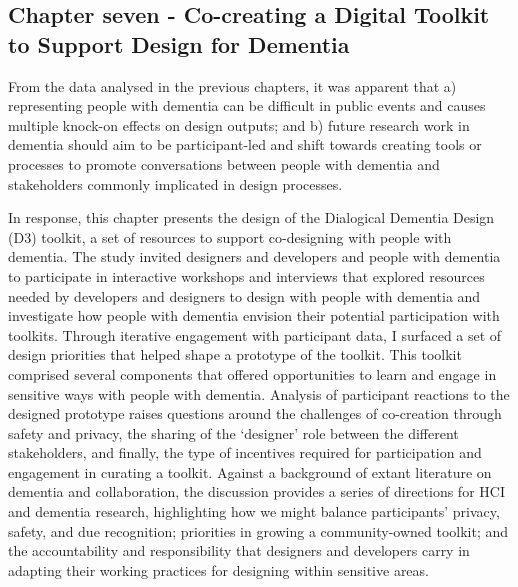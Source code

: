 \subsection{Chapter seven - Co-creating a Digital Toolkit to Support Design for Dementia}
\label{Intro:ChapterSeven}
From the data analysed in the previous chapters, it was apparent that a) representing people with dementia can be difficult in public events and causes multiple knock-on effects on design outputs; and b) future research work in dementia should aim to be participant-led and shift towards creating tools or processes to promote conversations between people with dementia and stakeholders commonly implicated in design processes.

In response, this chapter presents the design of the Dialogical Dementia Design (D3) toolkit, a set of resources to support co-designing with people with dementia. The study invited designers and developers and people with dementia to participate in interactive workshops and interviews that explored resources needed by developers and designers to design with people with dementia and investigate how people with dementia envision their potential participation with toolkits. Through iterative engagement with participant data, I surfaced a set of design priorities that helped shape a prototype of the toolkit. This toolkit comprised several components that offered opportunities to learn and engage in sensitive ways with people with dementia. Analysis of participant reactions to the designed prototype raises questions around the challenges of co-creation through safety and privacy, the sharing of the ‘designer’ role between the different stakeholders, and finally, the type of incentives required for participation and engagement in curating a toolkit. Against a background of extant literature on dementia and collaboration, the discussion provides a series of directions for HCI and dementia research, highlighting how we might balance participants' privacy, safety, and due recognition; priorities in growing a community-owned toolkit; and the accountability and responsibility that designers and developers carry in adapting their working practices for designing within sensitive areas.
